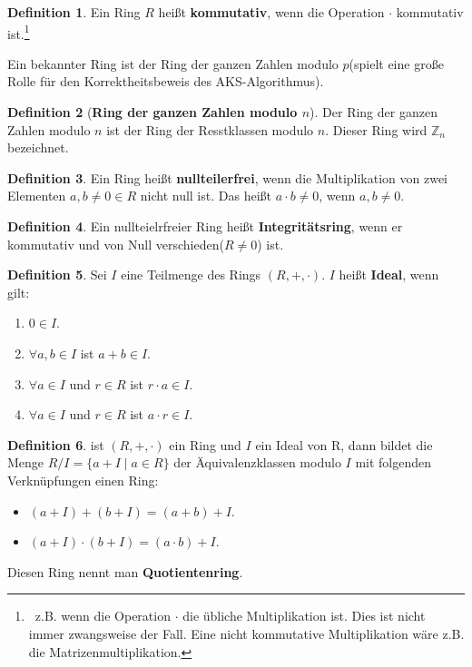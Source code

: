 \documentclass[12pt,oneside]{article}
\theoremstyle{remark}
\theoremstyle{definition}
\newtheorem{definition}{Definition}[section]
\begin{document}
\smallskip

\begin{definition}
Ein Ring $R$ heißt \textbf{kommutativ}, wenn die Operation $\cdot$ kommutativ ist.\footnote{ $\,$ z.B. wenn die Operation $\cdot$ die übliche Multiplikation ist. Dies ist nicht immer zwangsweise der Fall. Eine nicht kommutative Multiplikation wäre z.B. die Matrizenmultiplikation.}
\end{definition}

Ein bekannter Ring ist der Ring der ganzen Zahlen modulo $p$(spielt eine große Rolle für den Korrektheitsbeweis des AKS-Algorithmus).

\begin{definition}[\textbf{Ring der ganzen Zahlen modulo $n$}]\label{ring_mod}
Der Ring der ganzen Zahlen modulo $n$ ist der Ring der Resstklassen modulo $n$. Dieser Ring wird $\mathbb{Z}_n$ bezeichnet. 
\end{definition}


\begin{definition}
Ein Ring heißt \textbf{nullteilerfrei}, wenn die Multiplikation von zwei Elementen $a,b \neq 0 \in R$ nicht null ist. Das heißt $a \cdot b \neq 0$, wenn $a,b \neq 0$.
\end{definition}

\begin{definition}
Ein nullteielrfreier Ring heißt \textbf{Integritätsring}, wenn er kommutativ und von Null verschieden($R \neq 0$) ist. 
\end{definition}

\smallskip




\smallskip


\begin{definition}
Sei $I$ eine Teilmenge des Rings $(R,+,\cdot)$. $I$ heißt \textbf{Ideal}, wenn gilt:
\begin{enumerate}
    \item $0 \in I$.
    \item $\forall a,b \in I$ ist $a + b \in I$.
    \item $\forall a \in I$ und $r \in R$ ist $r \cdot a \in I$.
    \item $\forall a \in I$ und $r \in R$ ist $a \cdot r \in I$.
\end{enumerate}
\end{definition}

\smallskip 

\begin{definition}
ist $(R, +, \cdot)$ ein Ring und $I$ ein Ideal von R, dann bildet die Menge $R/I = \{ a + I \mid a \in R\}$ der Äquivalenzklassen modulo $I$ mit folgenden Verknüpfungen einen Ring:
\begin{itemize}
    \item $(a + I) + (b + I) = (a + b) + I$.
    \item $(a + I) \cdot (b + I) = (a \cdot b ) + I$.\newline
\end{itemize}
Diesen Ring nennt man \textbf{Quotientenring}. 
\end{definition}
\end{document}
